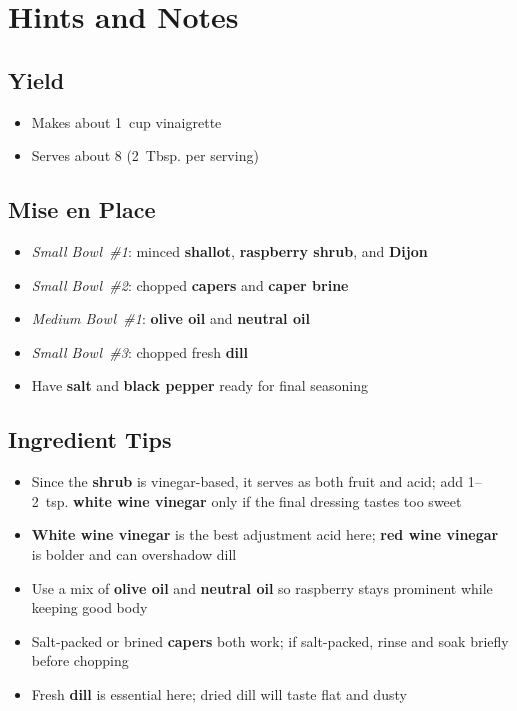 \documentclass[11pt,letterpaper]{article}
\begin{document}
\section*{Hints and Notes}

\subsection*{Yield}
\begin{itemize}
    \item Makes about 1~cup vinaigrette
    \item Serves about 8 (2~Tbsp. per serving)
\end{itemize}

\subsection*{Mise en Place}
\begin{itemize}
    \item \textit{Small Bowl~\#1}: minced \textbf{shallot}, \textbf{raspberry shrub}, and \textbf{Dijon}
    \item \textit{Small Bowl~\#2}: chopped \textbf{capers} and \textbf{caper brine}
    \item \textit{Medium Bowl~\#1}: \textbf{olive oil} and \textbf{neutral oil}
    \item \textit{Small Bowl~\#3}: chopped fresh \textbf{dill}
    \item Have \textbf{salt} and \textbf{black pepper} ready for final seasoning
\end{itemize}

\subsection*{Ingredient Tips}
\begin{itemize}
    \item Since the \textbf{shrub} is vinegar-based, it serves as both fruit and acid; add 1--2~tsp. \textbf{white wine vinegar} only if the final dressing tastes too sweet
    \item \textbf{White wine vinegar} is the best adjustment acid here; \textbf{red wine vinegar} is bolder and can overshadow dill
    \item Use a mix of \textbf{olive oil} and \textbf{neutral oil} so raspberry stays prominent while keeping good body
    \item Salt-packed or brined \textbf{capers} both work; if salt-packed, rinse and soak briefly before chopping
    \item Fresh \textbf{dill} is essential here; dried dill will taste flat and dusty
\end{itemize}
\end{document}

